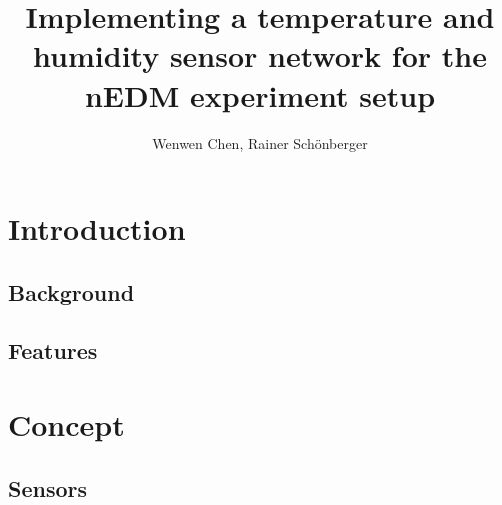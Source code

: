 \documentclass[a4paper]{scrreprt}
\title{Implementing a temperature and humidity sensor network for the nEDM
experiment setup}
\author{Wenwen Chen, Rainer Schönberger}
\begin{document}
\maketitle
\tableofcontents
\chapter{Introduction}
\section{Background}
\section{Features}
\chapter{Concept}
\section{Sensors}
\end{document}
